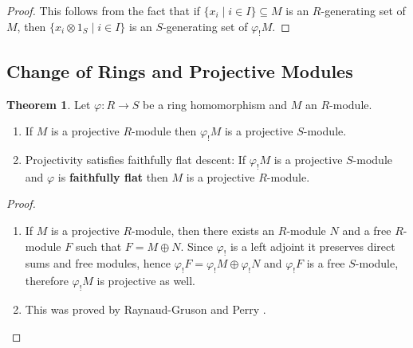 \documentclass[oneside,11pt]{amsart}
\theoremstyle{definition}
\newtheorem{proof techniques}{Proof Techniques}
\newtheorem{theorem}{Theorem}
\begin{document}
\begin{proof}
This follows from the fact that if $\{ x_i \mid i \in I \} \subseteq M$ is an $R$-generating set of $M$, then $\{ x_i \otimes 1_S \mid i \in I \}$ is an $S$-generating set of $\varphi_!  M$.
\end{proof}



\subsection{Change of Rings and Projective Modules} 

\begin{theorem}\label{thm: extension of scalars and projectivity}
Let $\varphi : R \to S$ be a ring homomorphism and $M$ an $R$-module.

\begin{enumerate}

\item If $M$ is a projective $R$-module then $\varphi_! M$ is a projective $S$-module. 

\item Projectivity satisfies faithfully flat descent: If $\varphi_! M$ is a projective $S$-module and $\varphi$ is \textbf{faithfully flat} then $M$ is a projective $R$-module. 

\end{enumerate}

\end{theorem}

\begin{proof}

\

\begin{enumerate}

\item If $M$ is a projective $R$-module, then there exists an $R$-module $N$ and a free $R$-module $F$ such that $F = M \oplus N$. Since $\varphi_!$ is a left adjoint it preserves direct sums and free modules, hence $\varphi_! F = \varphi_! M \oplus \varphi_! N$ and $\varphi_! F$ is a free $S$-module, therefore $\varphi_! M$ is projective as well. 

\item This was proved by Raynaud-Gruson \cite{raynaud-gruson1971} and Perry \cite{perry2010}. 

\end{enumerate}

\end{proof}
\end{document}
